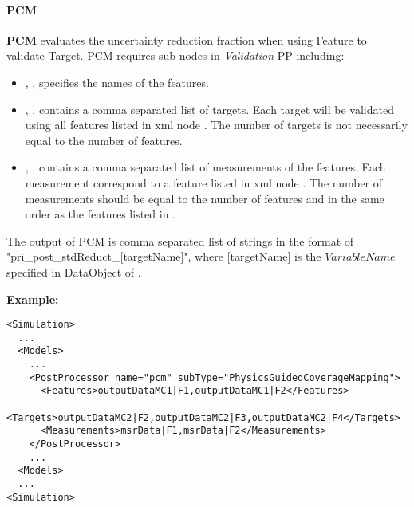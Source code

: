 \paragraph{PCM}
\textbf{PCM} evaluates the uncertainty reduction fraction when using Feature to validate Target. 
PCM requires sub-nodes in \textit{Validation} PP including:

%
%

\begin{itemize}
  \item {}, , specifies the names of the features.
  \item {}, , contains a comma separated list of
     targets. \nb Each target will be validated using all features listed in xml node . The
    number of targets is not necessarily equal to the number of features.
  \item {}, , contains a comma separated list of
     measurements of the features. \nb Each measurement correspond to a feature listed in xml node . The
    number of measurements should be equal to the number of features and in the same order as the features listed in .
\end{itemize}

The output of PCM is comma separated list of strings in the format of "pri\_post\_stdReduct\_[targetName]", 
where [targetName] is the $VariableName$ specified in DataObject of .


\textbf{Example:}
\begin{lstlisting}[style=XML,morekeywords={subType}]
<Simulation>
  ...
  <Models>
    ...
    <PostProcessor name="pcm" subType="PhysicsGuidedCoverageMapping">
      <Features>outputDataMC1|F1,outputDataMC1|F2</Features>
      <Targets>outputDataMC2|F2,outputDataMC2|F3,outputDataMC2|F4</Targets>
      <Measurements>msrData|F1,msrData|F2</Measurements>
    </PostProcessor>
    ...
  <Models>
  ...
<Simulation>
\end{lstlisting}
